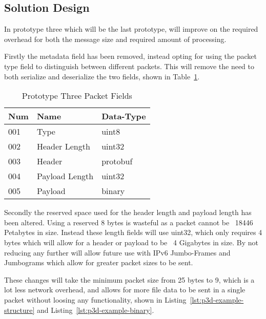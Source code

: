 \subsection*{Solution Design}
In prototype three which will be the last prototype, will improve on the required overhead for both the message size and required amount of processing.

Firstly the metadata field has been removed, instead opting for using the packet type field to distinguish between different packets. This will remove the need to both serialize and deserialize the two fields, shown in Table~\ref{tab:p3d-packet-fields}.

\begin{table}[h!]
    \caption{Prototype Three Packet Fields}
    \label{tab:p3d-packet-fields}
    \centering
    \begin{tabular}{ l l l }
        \hline
        \textbf{Num} & \textbf{Name}  & \textbf{Data-Type} \\
        \hline
        001          & Type           & uint8              \\
        \hline
        002          & Header Length  & uint32             \\
        \hline
        003          & Header         & protobuf           \\
        \hline
        004          & Payload Length & uint32             \\
        \hline
        005          & Payload        & binary             \\
        \hline
    \end{tabular}
\end{table}

Secondly the reserved space used for the header length and payload length has been altered. Using a reserved 8 bytes is wasteful as a packet cannot be ~18446 Petabytes in size. Instead these length fields will use uint32, which only requires 4 bytes which will allow for a header or payload to be ~4 Gigabytes in size. By not reducing any further will allow future use with IPv6 Jumbo-Frames and Jumbograms which allow for greater packet sizes to be sent. %

These changes will take the minimum packet size from 25 bytes to 9, which is a lot less network overhead, and allows for more file data to be sent in a single packet without loosing any functionality, shown in Listing~\ref{lst:p3d-example-structure} and Listing~\ref{lst:p3d-example-binary}.

